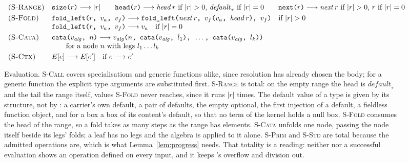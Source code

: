 \begin{figure}[htbp]
\[\begin{array}{ll}
\textsc{(S-Range)} & \texttt{size(}r\texttt{)} \longrightarrow |r| \qquad \texttt{head(}r\texttt{)} \longrightarrow \mathit{head}\,r \text{ if } |r| > 0 \text{, } \mathit{default}_\tau \text{ if } |r| = 0 \qquad \texttt{next(}r\texttt{)} \longrightarrow \mathit{next}\,r \text{ if } |r| > 0 \text{, } r \text{ if } |r| = 0 \\[3pt]
\textsc{(S-Fold)} & \texttt{fold\_left(}r\texttt{, }v_a\texttt{, }v_f\texttt{)} \longrightarrow \texttt{fold\_left(}\mathit{next}\,r\texttt{, }v_f\texttt{(}v_a\texttt{, }\mathit{head}\,r\texttt{), }v_f\texttt{)} \quad \text{if } |r| > 0 \\
 & \texttt{fold\_left(}r\texttt{, }v_a\texttt{, }v_f\texttt{)} \longrightarrow v_a \quad \text{if } |r| = 0 \\[3pt]
\textsc{(S-Cata)} & \texttt{cata(}v_{\mathit{alg}}\texttt{, }n\texttt{)} \longrightarrow v_{\mathit{alg}}\texttt{(}n\texttt{, cata(}v_{\mathit{alg}}\texttt{, }l_1\texttt{), }\ldots\texttt{, cata(}v_{\mathit{alg}}\texttt{, }l_k\texttt{))} \\
 & \qquad \text{for a node } n \text{ with legs } l_1 \ldots l_k \\[3pt]
\textsc{(S-Ctx)} & E[e] \longrightarrow E[e'] \quad \text{if } e \longrightarrow e' \\
\end{array}
\]
\normalsize
\caption{Evaluation.
\textsc{S-Call} covers specialisations and generic functions alike, since resolution has already chosen the body; for a generic function the explicit type arguments are substituted first.
\textsc{S-Range} is total: on the empty range the head is $\mathit{default}_\tau$ and the tail the range itself, values \textsc{S-Fold} never reaches, since it runs $|r|$ times.
The default value of a type is given by its structure, not by : a carrier's own default, a pair of defaults, the empty optional, the first injection of a default, a fieldless function object, and for a box a box of its content's default, so that no term of the kernel holds a null box.
\textsc{S-Fold} consumes the head of the range, so a fold takes as many steps as the range has elements.
\textsc{S-Cata} unfolds one node, passing the node itself beside its legs' folds; a leaf has no legs and the algebra is applied to it alone.
\textsc{S-Prim} and \textsc{S-Std} are total because the admitted operations are, which is what Lemma~\ref{lem:progress} needs.
That totality is a reading: neither  nor a successful evaluation shows an operation defined on every input, and it keeps 's overflow and division out.
}
\end{figure}
